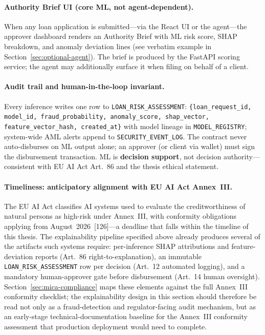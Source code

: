 \documentclass[12pt,a4paper]{report}
\begin{document}
\paragraph{Authority Brief UI (core ML, not agent-dependent).}
When any loan application is submitted---via the React UI or the agent---the approver dashboard renders an Authority Brief with ML risk score, SHAP breakdown, and anomaly deviation lines (see verbatim example in Section~\ref{sec:optional-agent}). The brief is produced by the FastAPI scoring service; the agent may additionally surface it when filing on behalf of a client.

\paragraph{Audit trail and human-in-the-loop invariant.}
Every inference writes one row to \texttt{LOAN\_RISK\_ASSESSMENT}: \texttt{\{loan\_request\_id, model\_id, fraud\_probability, anomaly\_score, shap\_vector, feature\_vector\_hash, created\_at\}} with model lineage in \texttt{MODEL\_REGISTRY}; system-wide AML alerts append to \texttt{SECURITY\_EVENT\_LOG}. The contract never auto-disburses on ML output alone; an approver (or client via wallet) must sign the disbursement transaction. ML is \textbf{decision support}, not decision authority---consistent with EU AI Act Art.~86 and the thesis ethical statement.

\paragraph{Timeliness: anticipatory alignment with EU AI Act Annex~III.}
The EU AI Act classifies AI systems used to evaluate the creditworthiness
of natural persons as high-risk under Annex~III, with conformity
obligations applying from August~2026~[126]---a deadline that falls
within the timeline of this thesis. The explainability pipeline specified
above already produces several of the artifacts such systems require:
per-inference SHAP attributions and feature-deviation reports (Art.~86
right-to-explanation), an immutable \texttt{LOAN\_RISK\_ASSESSMENT} row per
decision (Art.~12 automated logging), and a mandatory human-approver gate
before disbursement (Art.~14 human oversight). Section~\ref{sec:mica-compliance}
maps these elements against the full Annex~III conformity checklist; the
explainability design in this section should therefore be read not only
as a fraud-detection and regulator-facing audit mechanism, but as an
early-stage technical-documentation baseline for the Annex~III conformity
assessment that production deployment would need to complete.
\end{document}
